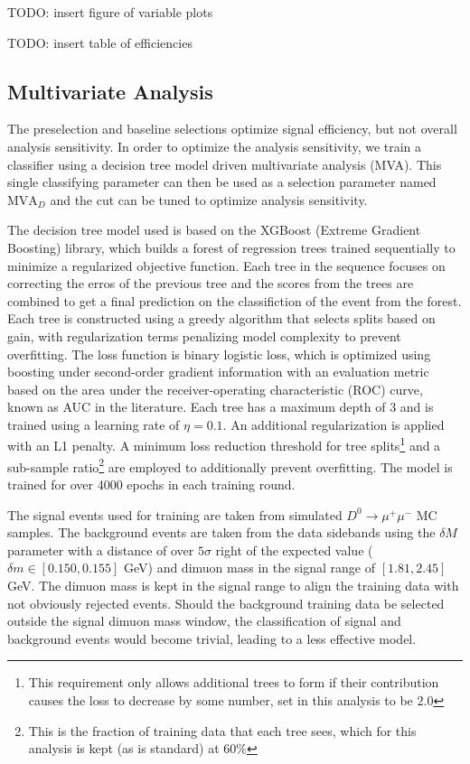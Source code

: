 TODO: insert figure of variable plots

TODO: insert table of efficiencies


\subsection{Multivariate Analysis}
\label{subsec:mva}

The preselection and baseline selections optimize signal efficiency, but not overall analysis sensitivity. In order to optimize the analysis sensitivity, we train a classifier using a decision tree model driven multivariate analysis (MVA). This single classifying parameter can then be used as a selection parameter named $\text{MVA}_D$ and the cut can be tuned to optimize analysis sensitivity.

The decision tree model used is based on the XGBoost (Extreme Gradient Boosting) library, which builds a forest of regression trees trained sequentially to minimize a regularized objective function. Each tree in the sequence focuses on correcting the erros of the previous tree and the scores from the trees are combined to get a final prediction on the classifiction of the event from the forest. Each tree is constructed using a greedy algorithm that selects splits based on gain, with regularization terms penalizing model complexity to prevent overfitting. The loss function is binary logistic loss, which is optimized using boosting under second-order gradient information with an evaluation metric based on the area under the receiver-operating characteristic (ROC) curve, known as AUC in the literature. Each tree has a maximum depth of 3 and is trained using a learning rate of $\eta = 0.1$. An additional regularization is applied with an L1 penalty. A minimum loss reduction threshold for tree splits\footnote{This requirement only allows additional trees to form if their contribution causes the loss to decrease by some number, set in this analysis to be $2.0$} and a sub-sample ratio\footnote{This is the fraction of training data that each tree sees, which for this analysis is kept (as is standard) at $60\%$} are employed to additionally prevent overfitting. The model is trained for over 4000 epochs in each training round.

The signal events used for training are taken from simulated $D^0 \to \mu^+ \mu^-$ MC samples. The background events are taken from the data sidebands using the $\delta M$ parameter with a distance of over $5\sigma$ right of the expected value ($\delta m \in [0.150, 0.155]$ GeV) and dimuon mass in the signal range of $[1.81, 2.45]$ GeV. The dimuon mass is kept in the signal range to align the training data with not obviously rejected events. Should the background training data be selected outside the signal dimuon mass window, the classification of signal and background events would become trivial, leading to a less effective model.

